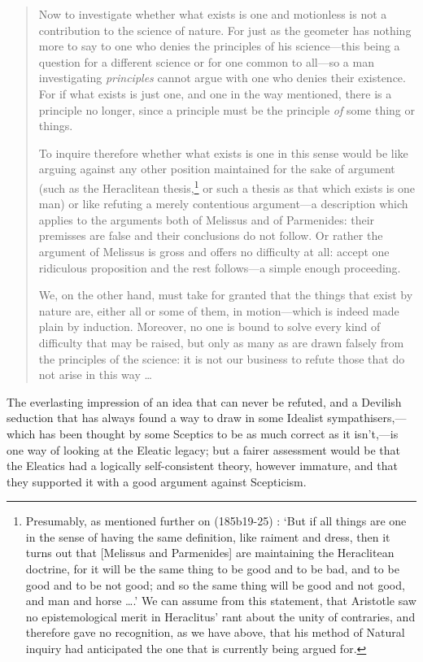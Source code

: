 \begin{quotation}
Now to investigate whether what exists is one and motionless is not a contribution to the science of nature. For just as the geometer has nothing more to say to one who denies the principles of his science---this being a question for a different science or for one common to all---so a man investigating \textit{principles} cannot argue with one who denies their existence. For if what exists is just one, and one in the way mentioned, there is a principle no longer, since a principle must be the principle \textit{of} some thing or things.

To inquire therefore whether what exists is one in this sense would be like arguing against any other position maintained for the sake of argument (such as the Heraclitean thesis,\footnote{Presumably, as mentioned further on (185b19-25) \cite{Aristotle1984}: `But if all things are one in the sense of having the same definition, like raiment and dress, then it turns out that [Melissus and Parmenides] are maintaining the Heraclitean doctrine, for it will be the same thing to be good and to be bad, and to be good and to be not good; and so the same thing will be good and not good, and man and horse \ldots.' We can assume from this statement, that Aristotle saw no epistemological merit in Heraclitus' rant about the unity of contraries, and therefore gave no recognition, as we have above, that his method of Natural inquiry had anticipated the one that is currently being argued for.} or such a thesis as that which exists is one man) or like refuting a merely contentious argument---a description which applies to the arguments both of Melissus and of Parmenides: their premisses are false and their conclusions do not follow. Or rather the argument of Melissus is gross and offers no difficulty at all: accept one ridiculous proposition and the rest follows---a simple enough proceeding.

We, on the other hand, must take for granted that the things that exist by nature are, either all or some of them, in motion---which is indeed made plain by induction. Moreover, no one is bound to solve every kind of difficulty that may be raised, but only as many as are drawn falsely from the principles of the science: it is not our business to refute those that do not arise in this way \ldots
\end{quotation}

The everlasting impression of an idea that can never be refuted, and a Devilish seduction that has always found a way to draw in some Idealist sympathisers,---which has been thought by some Sceptics to be as much correct as it isn't,---is one way of looking at the Eleatic legacy; but a fairer assessment would be that the Eleatics had a logically self-consistent theory, however immature, and that they supported it with a good argument against Scepticism.

